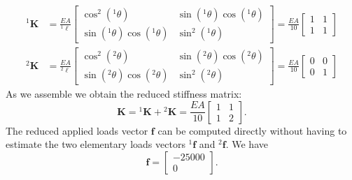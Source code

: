 \documentclass[12pt]{article}
\begin{document}
\begin{align*}
    {}^1\mathbf{K} & =\frac{EA}{{}^1\ell}\begin{bmatrix}
                                             \cos^2({}^1\theta)               & \sin({}^1\theta)\cos({}^1\theta) \\
                                             \sin({}^1\theta)\cos({}^1\theta) & \sin^2({}^1\theta)
                                         \end{bmatrix} = \frac{EA}{10}\begin{bmatrix}
                                                                          1 & 1 \\
                                                                          1 & 1
                                                                      \end{bmatrix} \\
    {}^2\mathbf{K} & =\frac{EA}{{}^2\ell}\begin{bmatrix}
                                             \cos^2({}^2\theta)               & \sin({}^2\theta)\cos({}^2\theta) \\
                                             \sin({}^2\theta)\cos({}^2\theta) & \sin^2({}^2\theta)
                                         \end{bmatrix}=\frac{EA}{10}\begin{bmatrix}
                                                                        0 & 0 \\
                                                                        0 & 1
                                                                    \end{bmatrix}
\end{align*}
As we assemble we obtain the reduced stiffness matrix:
$$
    {}\mathbf{K}={}^1\mathbf{K}+{}^2\mathbf{K} =\frac{EA}{10}
    \begin{bmatrix} 1 & 1 \\ 1 & 2
    \end{bmatrix}.
$$
The reduced applied loads vector $\mathbf f$ can be computed directly without having to estimate the two elementary loads vectors ${}^1\mathbf f$ and ${}^2\mathbf f$. We have
$$\mathbf f= \begin{bmatrix} -25000 \\ 0
    \end{bmatrix}.$$
\end{document}
